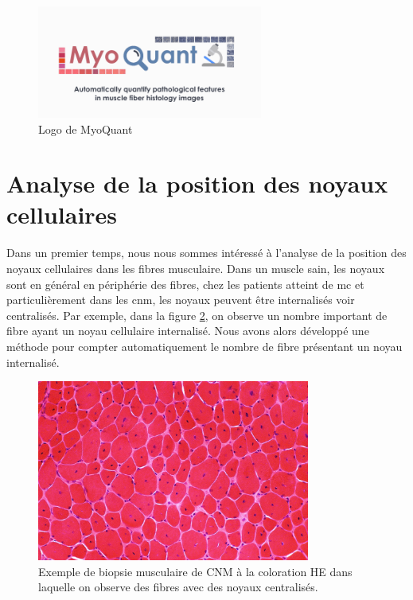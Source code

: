 \begin{figure}[htbp]
 \centering
 \includegraphics[width=0.66\textwidth]{figures/myoquant_logo.png}
 \caption[Logo MyoQuant]{Logo de MyoQuant}
 \label{fig:myoquant_logo}
\end{figure}

\section{Analyse de la position des noyaux cellulaires}
Dans un premier temps, nous nous sommes intéressé à l'analyse de la position des noyaux cellulaires dans les fibres musculaire. Dans un muscle sain, les noyaux sont en général en périphérie des fibres, chez les patients atteint de \gls{mc} et particulièrement dans les \gls{cnm}, les noyaux peuvent être internalisés voir centralisés. Par exemple, dans la figure \ref{fig:he_example}, on observe un nombre important de fibre ayant un noyau cellulaire internalisé. Nous avons alors développé une méthode pour compter automatiquement le nombre de fibre présentant un noyau internalisé.
\begin{figure}[htbp]
 \centering
 \includegraphics[width=0.8\textwidth]{figures/he_example.jpg}
 \caption[Exemple de biopsie musculaire à la coloration HE]{Exemple de biopsie musculaire de CNM à la coloration HE dans laquelle on observe des fibres avec des noyaux centralisés.}
 \label{fig:he_example}
\end{figure}

